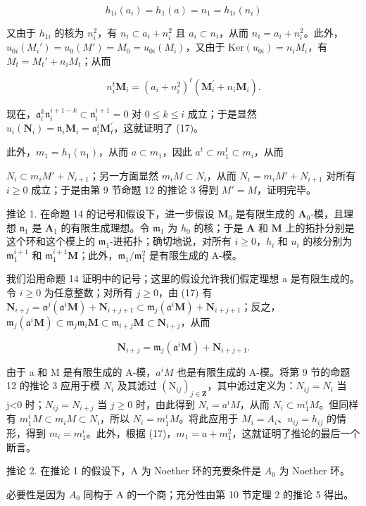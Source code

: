 \[
h _ {1 i} (a _ {i}) = h _ {1} (a) = n _ {1} = h _ {1 i} (n _ {i})
\]

	又由于 \(h_{1i}\) 的核为 \(n_i^2\)，有 \(n_i \subset a_i + n_i^2\) 且 \(a_i \subset n_i\)，从而 \(n_i = a_i + n_i^2\)。此外，\(u_{0i}(M_i') = u_0(M') = M_0 = u_{0i}(M_i)\)，又由于 \(\text{Ker}(u_{0i}) = n_iM_i\)，有 \(M_t = M_t' + n_iM_t\)；从而

\[
n _ {i} ^ {t} \mathbf {M} _ {i} = (a _ {i} + n _ {i} ^ {2}) ^ {t} (\mathbf {M} _ {i} ^ {\prime} + n _ {i} \mathbf {M} _ {i}).
\]

	现在，\(\mathfrak{a}_i^k\mathfrak{n}_i^{i + 1 - k}\subset \mathfrak{n}_i^{i + 1} = 0\) 对 \(0\leqslant k\leqslant i\) 成立；于是显然 \(u_{i}(\mathbf{N}_{i}) = \mathfrak{n}_{i}\mathbf{M}_{i} = \mathfrak{a}_{i}^{i}\mathbf{M}_{t}^{\prime}\)，这就证明了 (17)。

	此外，\(m_1 = h_1(n_1)\)，从而 \(a \subset m_1\)，因此 \(a^t \subset m_1^t \subset m_i\)，从而

	\(N_{i} \subset m_{i}M' + N_{i+1}\)；另一方面显然 \(m_{i}M \subset N_{i}\)，从而 \(N_{i} = m_{i}M' + N_{i+1}\) 对所有 \(i \geqslant 0\) 成立；于是由第 9 节命题 12 的推论 3 得到 \(M' = M\)，证明完毕。

	推论 1. 在命题 14 的记号和假设下，进一步假设 \(\mathbf{M}_0\) 是有限生成的 \(\mathbf{A}_0\)-模，且理想 \(\mathfrak{n}_1\) 是 \(\mathbf{A}_1\) 的有限生成理想。令 \(\mathfrak{m}_1\) 为 \(h_0\) 的核；于是 \(\mathbf{A}\) 和 \(\mathbf{M}\) 上的拓扑分别是这个环和这个模上的 \(\mathfrak{m}_1\)-进拓扑；确切地说，对所有 \(i \geqslant 0\)，\(h_i\) 和 \(u_i\) 的核分别为 \(\mathfrak{m}_1^{i+1}\) 和 \(\mathfrak{m}_1^{i+1}\mathbf{M}\)；此外，\(\mathfrak{m}_1/\mathfrak{m}_1^2\) 是有限生成的 A-模。

	我们沿用命题 14 证明中的记号；这里的假设允许我们假定理想 a 是有限生成的。令 \(i \geqslant 0\) 为任意整数；对所有 \(j \geqslant 0\)，由 (17) 有 \(\mathbf{N}_{i+j} = \mathfrak{a}^j (\mathfrak{a}^i\mathbf{M}) + \mathbf{N}_{i+j+1} \subset \mathfrak{m}_j(\mathfrak{a}^i\mathbf{M}) + \mathbf{N}_{i+j+1}\)；反之，\(\mathfrak{m}_j(\mathfrak{a}^i\mathbf{M}) \subset \mathfrak{m}_j\mathfrak{m}_i\mathbf{M} \subset \mathfrak{m}_{i+j}\mathbf{M} \subset \mathbf{N}_{i+j}\)，从而

\[
\mathbf {N} _ {i + j} = \mathfrak {m} _ {j} (\mathfrak {a} ^ {i} \mathbf {M}) + \mathbf {N} _ {i + j + 1}.
\]

	由于 a 和 M 是有限生成的 A-模，\(a^{i}M\) 也是有限生成的 A-模。将第 9 节的命题 12 的推论 3 应用于模 \(N_{i}\) 及其滤过 \((\mathrm{N}_{ij})_{j\in\mathbf{Z}}\)，其中滤过定义为：\(N_{ij}=N_{i}\) 当 j\textless0 时；\(N_{ij}=N_{i+j}\) 当 \(j\geqslant0\) 时，由此得到 \(N_{i}=a^{i}M\)，从而 \(N_{i}\subset m_{1}^{i}M\)。但同样有 \(m_{1}^{i}M\subset m_{i}M\subset N_{i}\)，所以 \(N_{i}=m_{1}^{i}M\)。将此应用于 \(M_{i}=A_{i}\)、\(u_{ij}=h_{ij}\) 的情形，得到 \(m_{i}=m_{1}^{i}\)。此外，根据 (17)，\(m_{1}=a+m_{1}^{2}\)，这就证明了推论的最后一个断言。

	推论 2. 在推论 1 的假设下，A 为 Noether 环的充要条件是 \(A_{0}\) 为 Noether 环。

	必要性是因为 \(A_{0}\) 同构于 A 的一个商；充分性由第 10 节定理 2 的推论 5 得出。

